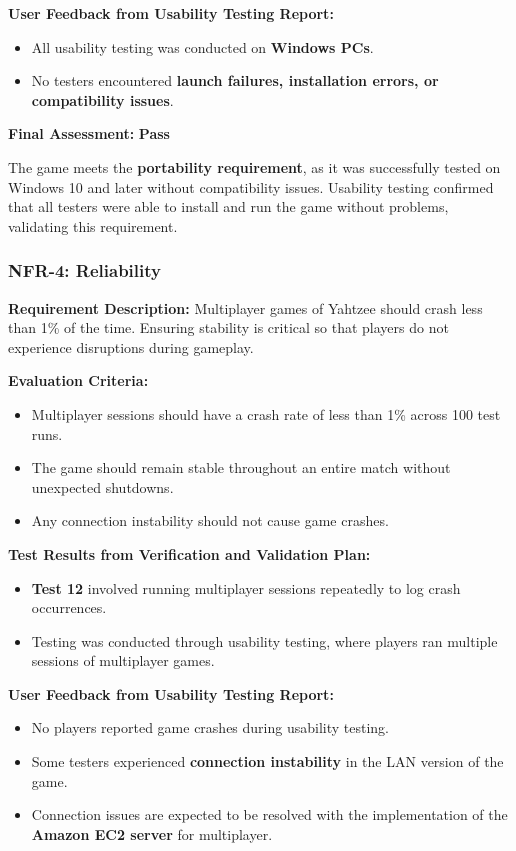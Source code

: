 \documentclass[12pt, titlepage]{article}
\begin{document}
\textbf{User Feedback from Usability Testing Report:}  
\begin{itemize}
    \item All usability testing was conducted on \textbf{Windows PCs}.
    \item No testers encountered \textbf{launch failures, installation errors, or compatibility issues}.
\end{itemize}

\textbf{Final Assessment:} \textbf{Pass}  

The game meets the \textbf{portability requirement}, as it was successfully tested on Windows 10 and later without compatibility issues. Usability testing confirmed that all testers were able to install and run the game without problems, validating this requirement.

\subsubsection{NFR-4: Reliability}

\textbf{Requirement Description:}  
Multiplayer games of Yahtzee should crash less than 1\% of the time. Ensuring stability is critical so that players do not experience disruptions during gameplay.

\textbf{Evaluation Criteria:}  
\begin{itemize}
    \item Multiplayer sessions should have a crash rate of less than 1\% across 100 test runs.
    \item The game should remain stable throughout an entire match without unexpected shutdowns.
    \item Any connection instability should not cause game crashes.
\end{itemize}

\textbf{Test Results from Verification and Validation Plan:}  
\begin{itemize}
    \item \textbf{Test 12} involved running multiplayer sessions repeatedly to log crash occurrences.
    \item Testing was conducted through usability testing, where players ran multiple sessions of multiplayer games.
\end{itemize}

\textbf{User Feedback from Usability Testing Report:}  
\begin{itemize}
    \item No players reported game crashes during usability testing.
    \item Some testers experienced \textbf{connection instability} in the LAN version of the game.
    \item Connection issues are expected to be resolved with the implementation of the \textbf{Amazon EC2 server} for multiplayer.
\end{itemize}
\end{document}
